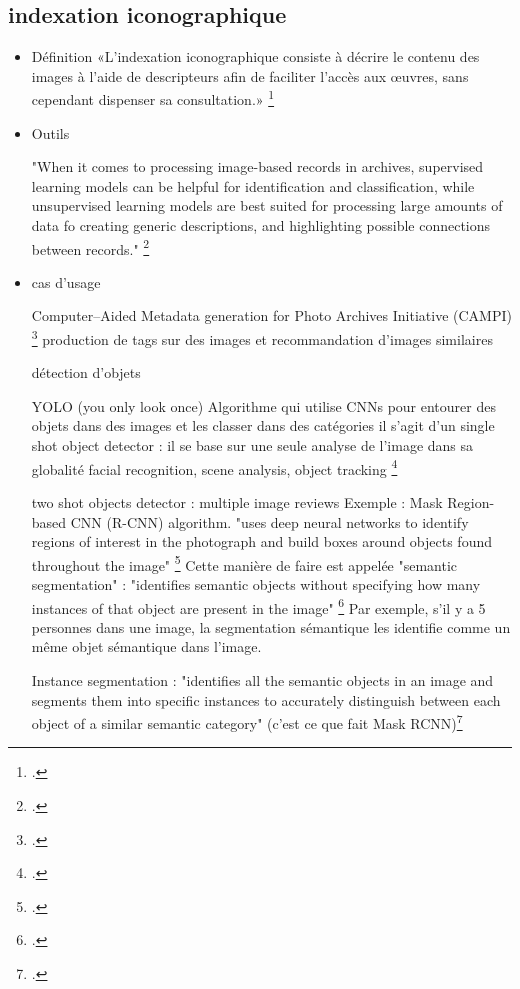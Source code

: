 \subsection{indexation iconographique}



\begin{itemize}

\item Définition
«L'indexation iconographique consiste à décrire le contenu des images à l'aide de descripteurs afin de faciliter l'accès aux œuvres, sans cependant dispenser sa consultation.»
\footcite[p.~3]{husson2025}

\item Outils 

"When it comes to processing image-based records in archives, supervised learning models can be	helpful for identification and classification, while unsupervised learning	models are best suited for processing large amounts of data fo creating	generic descriptions, and highlighting possible connections between records."
\footcite{fewster}

\item cas d'usage 

Computer–Aided Metadata generation for Photo Archives Initiative (CAMPI) \footcite{fewster} production de tags sur des images et recommandation d'images similaires 

\subitem détection d'objets 

YOLO (you only look once)
Algorithme qui utilise CNNs pour entourer des objets dans des images et les classer dans des catégories 
il s'agit d'un single shot object detector : il se base sur une seule analyse de l'image dans sa globalité 
facial recognition, scene analysis, object tracking \footcite{fewster}

two shot objects detector : multiple image reviews 
Exemple : Mask	Region-based CNN (R-CNN) algorithm. "uses deep neural networks to	identify regions of interest in the photograph and build boxes around objects	found throughout the image" \footcite{fewster}
Cette manière de faire est appelée "semantic segmentation" : "identifies semantic objects	without specifying how many instances of that object are present in the	image" \footcite{fewster}
Par exemple, s'il y a 5 personnes dans une image, la segmentation sémantique les identifie comme un même objet sémantique dans l'image.

	Instance segmentation : "identifies all the semantic objects in	an image and segments them into specific instances to accurately distinguish	between each object of a similar semantic category" (c'est ce que fait Mask RCNN)\footcite{fewster}
	

\end{itemize}
